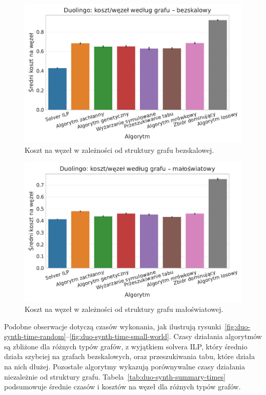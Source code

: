 \begin{figure}[H]
  \centering
  \includegraphics[width=0.65\linewidth]{assets/figures/benchmark/synthetic/duolingo_cost_per_node_by_graph_scale_free.pdf}
  \caption{Koszt na węzeł w zależności od struktury grafu bezskalowej.}
  \label{fig:duo-synth-cost-scale-free}
\end{figure}

\begin{figure}[H]
  \centering
  \includegraphics[width=0.65\linewidth]{assets/figures/benchmark/synthetic/duolingo_cost_per_node_by_graph_small_world.pdf}
  \caption{Koszt na węzeł w zależności od struktury grafu małoświatowej.}
  \label{fig:duo-synth-cost-small-world}
\end{figure}

Podobne obserwacje dotyczą czasów wykonania, jak ilustrują rysunki~\ref{fig:duo-synth-time-random}--\ref{fig:duo-synth-time-small-world}. Czasy działania algorytmów są zbliżone dla różnych typów grafów, z wyjątkiem solvera ILP, który średnio działa szybciej na grafach bezskalowych, oraz przeszukiwania tabu, które działa na nich dłużej. Pozostałe algorytmy wykazują porównywalne czasy działania niezależnie od struktury grafu. Tabela~\ref{tab:duo-synth-summary-times} podsumowuje średnie czasów i kosztów na węzeł dla różnych typów grafów.

